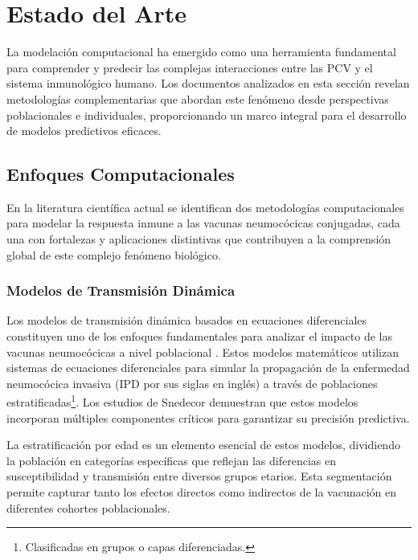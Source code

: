 \chapter{Estado del Arte}\label{chapter:estadoarte}

La modelación computacional ha emergido como una herramienta fundamental para comprender y predecir las complejas interacciones entre las PCV y el sistema inmunológico humano. Los documentos analizados en esta sección revelan metodologías complementarias que abordan este fenómeno desde perspectivas poblacionales e individuales, proporcionando un marco integral para el desarrollo de modelos predictivos eficaces.

\section{Enfoques Computacionales}

En la literatura científica actual se identifican dos metodologías computacionales para modelar la respuesta inmune a las vacunas neumocócicas conjugadas, cada una con fortalezas y aplicaciones distintivas que contribuyen a la comprensión global de este complejo fenómeno biológico.

\subsection{Modelos de Transmisión Dinámica}

Los modelos de transmisión dinámica basados en ecuaciones diferenciales constituyen uno de los enfoques fundamentales para analizar el impacto de las vacunas neumocócicas a nivel poblacional \cite{Choi2021}. Estos modelos matemáticos utilizan sistemas de ecuaciones diferenciales para simular la propagación de la enfermedad neumocócica invasiva (IPD por sus siglas en inglés) a través de poblaciones estratificadas\footnote{Clasificadas en grupos o capas diferenciadas.}. Los estudios de Snedecor \cite{Snedecor2020a} demuestran que estos modelos incorporan múltiples componentes críticos para garantizar su precisión predictiva.

La estratificación por edad es un elemento esencial de estos modelos, dividiendo la población en categorías específicas que reflejan las diferencias en susceptibilidad y transmisión entre diversos grupos etarios. Esta segmentación permite capturar tanto los efectos directos como indirectos de la vacunación en diferentes cohortes poblacionales.


